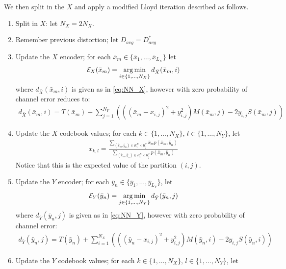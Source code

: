 We then split in the $X$ and apply a modified Lloyd iteration described as follows.
\begin{enumerate}
    
    \item \label{init_split} Split in $X$: let $N_X=2N_X$.
    \item \label{init_start} Remember previous distortion; let $D_{avg}=D^*_{avg}$
    \item Update the $X$ encoder; for each $\bar x_m\in\{\bar x_1,\ldots,\bar x_{L_X}\}$ let
    \begin{align}
        \mathcal E_X(\bar x_m) = \operatorname*{arg\,min}_{i \in \{1,\dots,N_X\}}d_{\bar X}(\bar x_m,i)
    \end{align}
    where $d_{\bar X}(\bar x_m,i)$ is given as in \eqref{eq:NN_X}, however with zero probability of channel error reduces to:
    \begin{align}
        \label{eq:no_channel_NN_X}
        d_{\bar X}(\bar x_m,i) =
            T(\bar x_m) + 
            \sum_{j=1}^{N_Y}
            \left(\left({(\bar x_m-x_{i,j})}^2 +
            y_{i,j}^2\right)M(\bar x_m, j) -2y_{i,j}S(\bar x_m, j)\right)
    \end{align}
    \item Update the $X$ codebook values; for each $k\in \{1,\ldots,N_X\}$, $l\in\{1,\ldots,N_Y\}$, let
    \begin{align}
        x_{k,l} = 
            \frac{\sum_{(\bar x_m,\bar y_n)\in R_i^X\times R_j^Y}\bar x_m p(\bar x_m,\bar y_n)}
            {\sum_{(\bar x_m,\bar y_n)\in R_i^X\times R_j^Y}p(\bar x_m,\bar y_n)}
    \end{align}
    Notice that this is the expected value of the partition $(i,j)$.
    \item Update the $Y$ encoder; for each $\bar y_n\in \{\bar y_1,\ldots,\bar y_{L_Y}\}$, let
    \begin{align}
        \mathcal E_Y(\bar y_n) = \operatorname*{arg\,min}_{j\in\{1,\ldots,N_Y\}}d_{\bar Y}(\bar y_n,j)
    \end{align}
    where $d_{\bar Y}(\bar y_n,j)$ is given as in \eqref{eq:NN_Y}, however with zero probability of channel error:
    \begin{align}
        \label{eq:no_channel_NN_Y}
        d_{\bar Y}(\bar y_n,j) =
            T(\bar y_n) + 
            \sum_{i=1}^{N_X}
            \left(\left({(\bar y_n-x_{i,j})}^2 +
            y_{i,j}^2\right)M(\bar y_n, i) -2y_{i,j}S(\bar y_n, i)\right)
    \end{align}
    \item Update the $Y$ codebook values; for each $k\in \{1,\ldots,N_X\}$, $l\in\{1,\ldots,N_Y\}$, let

\end{enumerate}
